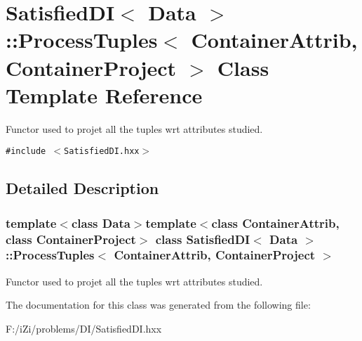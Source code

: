\section{Satisfied\-DI$<$ Data $>$::Process\-Tuples$<$ Container\-Attrib, Container\-Project $>$ Class Template Reference}
\label{class_satisfied_d_i_1_1_process_tuples}
Functor used to projet all the tuples wrt attributes studied.  


{\tt \#include $<$Satisfied\-DI.hxx$>$}



\subsection{Detailed Description}
\subsubsection*{template$<$class Data$>$template$<$class Container\-Attrib, class Container\-Project$>$ class Satisfied\-DI$<$ Data $>$::Process\-Tuples$<$ Container\-Attrib, Container\-Project $>$}

Functor used to projet all the tuples wrt attributes studied. 



The documentation for this class was generated from the following file:\begin{CompactItemize}
\item 
F:/i\-Zi/problems/DI/Satisfied\-DI.hxx\end{CompactItemize}
